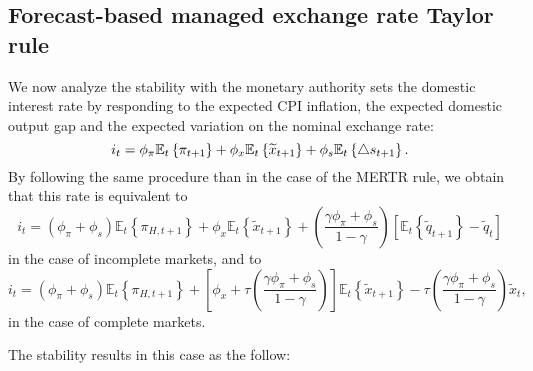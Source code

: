 \documentclass{article}
\begin{document}
\subsection{Forecast-based managed exchange rate Taylor rule}

We now analyze the stability with the monetary authority sets the domestic
interest rate by responding to the expected CPI inflation, the expected
domestic output gap and the expected variation on the nominal exchange rate:%
\begin{equation*}
i_{t}=\phi _{\pi }\mathbb{E}_{t}\left\{ \pi _{t+1}\right\} +\phi _{x}\mathbb{%
E}_{t}\left\{ \widetilde{x}_{t+1}\right\} +\phi _{s}\mathbb{E}_{t}\left\{
\bigtriangleup s_{t+1}\right\} .
\end{equation*}%
By following the same procedure than in the case of the MERTR rule, we
obtain that this rate is equivalent to%
\begin{equation*}
i_{t}=\left( \phi _{\pi }+\phi _{s}\right) \mathbb{E}_{t}\left\{ \pi
_{H,t+1}\right\} +\phi _{x}\mathbb{E}_{t}\left\{ \widetilde{x}_{t+1}\right\}
+\left( \frac{\gamma \phi _{\pi }+\phi _{s}}{1-\gamma }\right) \left[ 
\mathbb{E}_{t}\left\{ \widetilde{q}_{t+1}\right\} -\widetilde{q}_{t}\right]
\end{equation*}%
in the case of incomplete markets, and to%
\begin{equation*}
i_{t}=\left( \phi _{\pi }+\phi _{s}\right) \mathbb{E}_{t}\left\{ \pi
_{H,t+1}\right\} +\left[ \phi _{x}+\tau \left( \frac{\gamma \phi _{\pi
}+\phi _{s}}{1-\gamma }\right) \right] \mathbb{E}_{t}\left\{ \widetilde{x}%
_{t+1}\right\} -\tau \left( \frac{\gamma \phi _{\pi }+\phi _{s}}{1-\gamma }%
\right) \widetilde{x}_{t},
\end{equation*}%
in the case of complete markets.

The stability results in this case as the follow:
\end{document}
